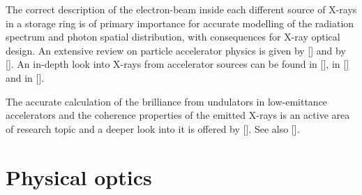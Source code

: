 \begin{refsection}
The correct description of the electron-beam inside each different source of X-rays in a storage ring is of primary importance for accurate modelling of the radiation spectrum and photon spatial distribution, with consequences for X-ray optical design.
An extensive review on particle accelerator physics is given by [\cite{Duke2000}] and by [\cite{Wiedemann2015}]. An in-depth look into X-rays from accelerator sources can be found in [\cite{Clarke2004}], in [\cite{Talman2006}] and in [\cite{Elleaume2013}].

The accurate calculation of the brilliance from undulators in low-emittance accelerators and the coherence properties of the emitted X-rays is an active area of research topic and a deeper look into it is offered by [\cite{Bazarov2012, Tanaka2014, Geloni2015, Geloni2008, Walker2019, Khubbutdinov2019}]. See also [\cite{Singer2014}].

\section{Physical optics}\label{sec:physical_optics}


\end{refsection}

